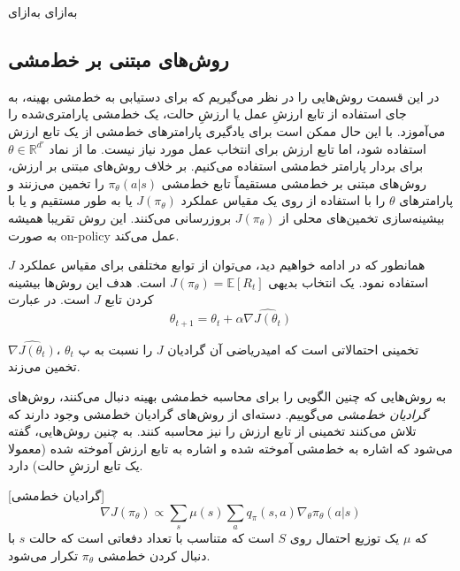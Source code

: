 ‌به‌ازای
‌به‌ازای


\subsection{روش‌های مبتنی بر خط‌مشی}


در این قسمت روش‌هایی را در نظر می‌گیریم که برای دستیابی به خط‌مشی بهینه، به جای استفاده از تابع ارزشِ عمل یا ارزشِ حالت، یک خط‌مشی پارامتری‌شده 
 را می‌آموزد. با این حال ممکن است برای یادگیری پارامترهای خط‌مشی از یک تابع ارزش استفاده شود، اما تابع ارزش برای انتخاب عمل مورد نیاز نیست. ما از نماد
$\theta \in \mathbb{R}^{d'}$ برای بردار پارامتر خط‌مشی استفاده می‌کنیم.
بر خلاف روش‌های مبتنی بر ارزش، روش‌های مبتنی بر خط‌مشی مستقیماً تابع خط‌مشی 
$\pi_\theta(a|s)$
 را تخمین می‌زنند و پارامترهای $\theta$ را با استفاده از 
  روی یک مقیاس عملکرد  
 $J(\pi_\theta)$ یا به طور مستقیم و یا با بیشینه‌سازی تخمین‌های محلی از  $J(\pi_\theta)$ بروزرسانی می‌کنند.
  این روش تقریبا همیشه به صورت on-policy  عمل می‌کند. 

همانطور که در ادامه خواهیم دید، می‌توان از توابع مختلفی برای مقیاس عملکرد $J$ استفاده نمود. یک انتخاب بدیهی 
$J(\pi_\theta) = \mathbb{E}[R_t]$
است. هدف این روش‌ها بیشینه کردن تابع $J$ است. در عبارت 
$$\theta_{t+1}=\theta_t + \alpha \hat{\nabla J(\theta_t)}$$
 
$\hat{\nabla J(\theta_t)}$،
تخمینی احتمالاتی است که امیدریاضی آن گرادیان  $J$ را نسبت به پ $\theta_t$ تخمین می‌زند.

به روش‌هایی که چنین الگویی را برای محاسبه خط‌مشی بهینه دنبال می‌کنند، روش‌های \textit{گرادیان خط‌مشی } می‌گوییم. دسته‌ای از روش‌های گرادیان خط‌مشی وجود دارند که تلاش می‌کنند تخمینی از تابع ارزش را نیز محاسبه کنند. به چنین روش‌هایی، \textit{} 
 گفته می‌شود که \textit{} 
  اشاره به خط‌مشی آموخته شده و \textit{} 
   اشاره به تابع ارزش آموخته شده (معمولا یک تابع ارزشِ حالت) دارد.

[گرادیان خط‌مشی]
$$\nabla J(\pi_\theta) \propto \sum_{s} \mu(s) \sum_{a} q_\pi(s,a) \nabla_\theta \pi_\theta(a|s)$$
که $\mu$ یک توزیع احتمال روی $S$ است که متناسب با تعداد دفعاتی است که حالت $s$ با دنبال کردن خط‌مشی 
$\pi_\theta$
 تکرار می‌شود.


